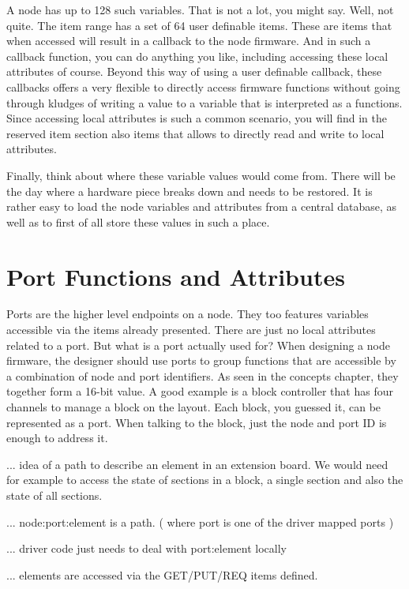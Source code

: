 A node has up to 128 such variables. That is not a lot, you might say. Well, not quite. The item range has a set of 64 user definable items. These are items that when accessed will result in a callback to the node firmware. And in such a callback function, you can do anything you like, including accessing these local attributes of course. Beyond this way of using a user definable callback, these callbacks offers a very flexible to directly access firmware functions without going through kludges of writing a value to a variable that is interpreted as a functions. Since accessing local attributes is such a common scenario, you will find in the reserved item section also items that allows to directly read and write to local attributes.

Finally, think about where these variable values would come from. There will be the day where a hardware piece breaks down and needs to be restored. It is rather easy to load the node variables and attributes from a central database, as well as to first of all store these values in such a place.

\section{Port Functions and Attributes}

Ports are the higher level endpoints on a node. They too features variables accessible via the items already presented. There are just no local attributes related to a port. But what is a port actually used for? When designing a node firmware, the designer should use ports to group functions that are accessible by a combination of node and port identifiers. As seen in the concepts chapter, they together form a 16-bit value. A good example is a block controller that has four channels to manage a block on the layout. Each block, you guessed it, can be represented as a port. When talking to the block, just the node and port ID is enough to address it.

... idea of a path to describe an element in an extension board. We would need for example to access the state of sections in a block, a single section and also the state of all sections.

... node:port:element is a path. ( where port is one of the driver mapped ports )

... driver code just needs to deal with port:element locally

... elements are accessed via the GET/PUT/REQ items defined. 

